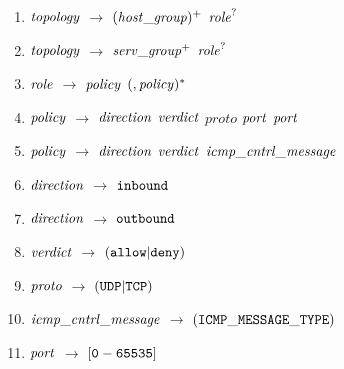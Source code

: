 \begin{enumerate}
\item \noindent ${\it topology}$ $\rightarrow$ $({\it host\_group})^{+}$ ${\it role}^{?}$ \\ 
\item ${\it topology}$ $\rightarrow$ ${\it serv\_group}^{+}$ ${\it role}^{?}$ \\ 






\item \noindent ${\it role}$ $\rightarrow$ ${\it policy}$ $({\it , policy})^{*}$ \\
\item ${\it policy}$ $\rightarrow$ ${\it direction}$ ${\it verdict}$ ${proto}$ ${\it port}$ ${\it port}$ \\ 
\item ${\it policy}$ $\rightarrow$ ${\it direction}$ ${\it verdict}$ ${\it icmp\_cntrl\_message}$ \\ 
\item ${\it direction}$ $\rightarrow$ ${\tt inbound}$ \\ 
\item ${\it direction}$ $\rightarrow$ ${\tt outbound}$ \\ 
\item ${\it verdict}$ $\rightarrow$ $({\tt allow}|{\tt deny})$ \\ 
\item ${\it proto}$ $\rightarrow$ $({\tt UDP  |  TCP})$ \\ 
\item ${\it icmp\_cntrl\_message}$ $\rightarrow$ $({\tt ICMP\_MESSAGE\_TYPE})$ \\ 
\item ${\it port}$ $\rightarrow$ ${\tt [0-65535]}$\\



\end{enumerate}
